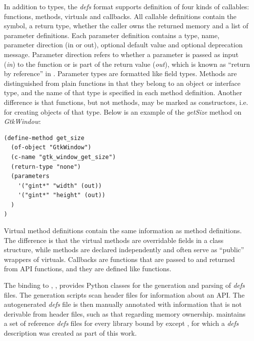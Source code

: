 \documentclass[article]{jss}
\begin{document}
In addition to types, the \emph{defs} format supports definition of
four kinds of callables: functions, methods, virtuals and
callbacks. All callable definitions contain the  symbol, a
return type, whether the caller owns the returned memory and a list of
parameter definitions. Each parameter definition contains a type,
name, parameter
direction (in or out), optional default value and optional deprecation
message. Parameter direction refers to whether a parameter is passed as input (\emph{in}) to the function or is part of the return value (\emph{out}), which is known as ``return by reference'' in . Parameter types are formatted like field types. Methods are distinguished from plain functions in that they belong to an object or interface type, and the name of that type is specified in each method definition.  Another difference is that functions, but not methods, may be marked as constructors, i.e. for creating objects of that type. 
Below is an
example of the \emph{getSize} method on \emph{GtkWindow}:
\begin{verbatim}
(define-method get_size
  (of-object "GtkWindow")
  (c-name "gtk_window_get_size")
  (return-type "none")
  (parameters
    '("gint*" "width" (out))
    '("gint*" "height" (out))
  )
)
\end{verbatim}
Virtual method definitions contain the same information as method
definitions. The difference is that the virtual methods
are overridable fields in a class structure, while methods are
declared independently and often serve as ``public'' wrappers of
virtuals.  Callbacks are functions that are passed to and returned
from API functions, and they are defined like functions. 

The  binding to ,
 \citep{PyGTK}, provides Python classes for the generation
and 
parsing of \emph{defs} files. The generation scripts scan 
header 
files for information about an API. The autogenerated \emph{defs} file
is then 
manually annotated with information that is not derivable from header
files, such as that
regarding memory ownership.  maintains a set of reference
\emph{defs} files
for every library bound by  except , for which a
\emph{defs}
description was created as part of this work.
\end{document}
